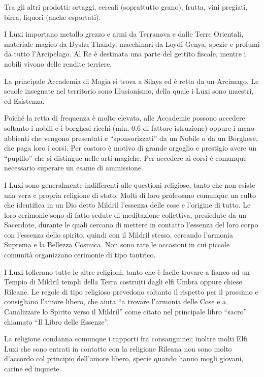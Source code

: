 Tra gli altri prodotti: ortaggi, cereali (soprattutto grano), frutta,
vini pregiati, birra, liquori (anche esportati). 

I Luxi importano metallo grezzo e armi da
Terranova e dalle Terre Orientali, materiale magico da Dyshu Thandy,
macchinari da Loydi-Genya, spezie e profumi da tutto l'Arcipelago. Al
Re \`e destinata una parte del gettito fiscale, mentre i nobili
vivono delle rendite terriere.

\Magia La principale Accademia di Magia si trova a Silays ed \`e retta da
un Arcimago. Le scuole insegnate nel territorio sono Illusionismo, della
quale i Luxi sono maestri, ed Esistenza.

Poich\'e la retta di frequenza \`e molto elevata, alle Accademie
possono accedere soltanto i nobili e i borghesi ricchi (min. 0.6 di
fattore istruzione) oppure i meno abbienti che vengono presentati e
``sponsorizzati'' da un Nobile o da un Borghese, che paga loro i
corsi.  Per costoro \`e motivo di grande orgoglio e prestigio avere
un ``pupillo'' che si distingue nelle arti magiche. Per accedere ai
corsi \`e comunque necessario superare un esame di ammissione.

\Religione I Luxi sono generalmente indifferenti alle questioni religiose, tanto
che non esiste una vera e propria religione di stato. Molti di loro
professano comunque un culto che identifica in un Dio detto Mildril
l'essenza delle cose e l'origine di tutto. Le loro cerimonie sono di
fatto sedute di meditazione collettiva, presiedute da un Sacerdote,
durante le quali cercano di mettere in contatto l'essenza del loro
corpo con l'essenza dello spirito, quindi con il Mildril stesso,
cercando l'armonia Suprema e la Bellezza Cosmica. Non sono rare le
occasioni in cui piccole comunit\`a organizzano cerimonie di tipo
tantrico.

I Luxi tollerano tutte le altre religioni, tanto che \`e facile
trovare a fianco ad un Tempio di Mildril templi della Terra costruiti
dagli elfi Umbra oppure chiese Rileane. Le regole di tipo religioso
prevedono soltanto il rispetto per il prossimo e consigliano l'amore
libero, che aiuta ``a trovare l'armonia delle Cose e a Canalizzare lo
Spirito verso il Mildril'' come citato nel principale libro ``sacro''
chiamato ``Il Libro delle Essenze''.

La religione condanna
comunque i rapporti fra consanguinei; inoltre molti Elfi Luxi che sono
entrati in contatto con la religione Rileana non sono molto d'accordo
col principio dell'amore libero, specie quando hanno mogli giovani,
carine ed inquiete. 

